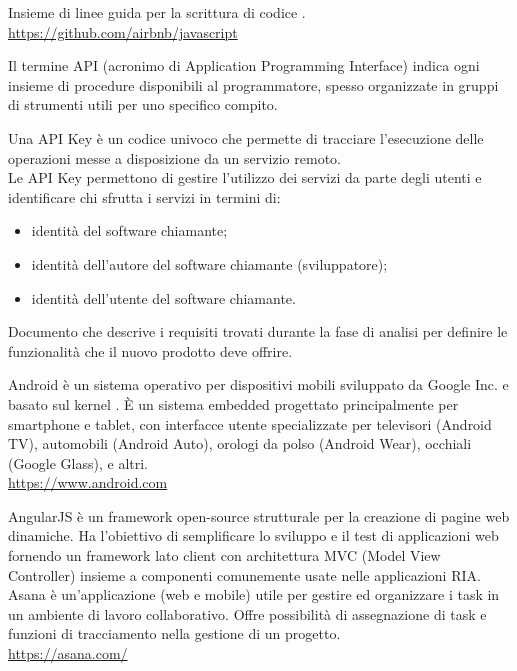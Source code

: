 Insieme di linee guida per la scrittura di codice .\\
\url{https://github.com/airbnb/javascript}

Il termine API (acronimo di Application Programming Interface) indica ogni insieme di procedure disponibili al programmatore, spesso organizzate in gruppi di strumenti utili per uno specifico compito.

Una API Key è un codice univoco che permette di tracciare l'esecuzione delle operazioni messe a disposizione da un servizio remoto.\\ 
Le API Key permettono di gestire l'utilizzo dei servizi da parte degli utenti e identificare chi sfrutta i servizi in termini di:
\begin{itemize}
  \item identità del software chiamante;
  \item identità dell'autore del software chiamante (sviluppatore);
  \item identità dell'utente del software chiamante.
\end{itemize}

Documento che descrive i requisiti trovati durante la fase di analisi per definire le funzionalità che il nuovo prodotto deve offrire.

Android è un sistema operativo per dispositivi mobili sviluppato da Google Inc. e basato sul kernel . \`{E} un sistema embedded progettato principalmente per smartphone e tablet, con interfacce utente specializzate per televisori (Android TV), automobili (Android Auto), orologi da polso (Android Wear), occhiali (Google Glass), e altri.\\
\url{https://www.android.com}

AngularJS è un framework open-source strutturale per la creazione di pagine web dinamiche. Ha l'obiettivo di semplificare lo sviluppo e il test di applicazioni web fornendo un framework lato client con architettura MVC (Model View Controller) insieme a componenti comunemente usate nelle applicazioni RIA.\\

Asana è un’applicazione (web e mobile) utile per gestire ed organizzare i task in un ambiente di lavoro collaborativo. Offre possibilità di assegnazione di task e funzioni di tracciamento nella gestione di un progetto.\\
\url{https://asana.com/}
\clearpage
